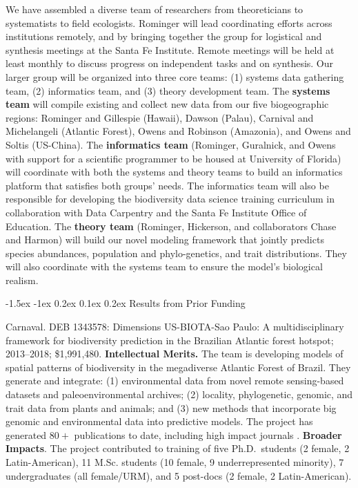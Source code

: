 \documentclass[11pt]{article}
\makeatletter
\renewcommand\section{\@startsection{section}{1}{\z@}%
                                  {-1.5ex \@plus -1ex \@minus 0.2ex}%
                                  {0.1ex \@plus 0.2ex}%
                                  {\normalfont\Large\bfseries}}
\renewcommand{\paragraph}{\@startsection{paragraph}{4}{\z@}
  {1.5ex \@plus 1ex \@minus .2ex}{-1em}
  {\normalfont\normalsize\it}
}
\makeatother
\begin{document}
We have assembled a diverse team of researchers from theoreticians to
systematists to field ecologists. Rominger will lead coordinating
efforts across institutions remotely, and by bringing together the group
for logistical and synthesis meetings at the Santa Fe Institute. Remote
meetings will be held at least monthly to discuss progress on
independent tasks and on synthesis. Our larger group will be organized
into three core teams: (1) systems data gathering team, (2) informatics
team, and (3) theory development team. The \textbf{systems team} will
compile existing and collect new data from our five biogeographic
regions: Rominger and Gillespie (Hawaii), Dawson (Palau), Carnival and
Michelangeli (Atlantic Forest), Owens and Robinson (Amazonia), and Owens
and Soltis (US-China). The \textbf{informatics team} (Rominger,
Guralnick, and Owens with support for a scientific programmer to be
housed at University of Florida) will coordinate with both the systems
and theory teams to build an informatics platform that satisfies both
groups' needs. The informatics team will also be responsible for
developing the biodiversity data science training curriculum in
collaboration with Data Carpentry and the Santa Fe Institute Office of
Education. The \textbf{theory team} (Rominger, Hickerson, and
collaborators Chase and Harmon) will build our novel modeling framework
that jointly predicts species abundances, population and phylo-genetics,
and trait distributions. They will also coordinate with the systems team
to ensure the model's biological realism.

\section{Results from Prior Funding} \label{results-from-prior-funding}

\paragraph{Carnaval.} DEB 1343578: Dimensions US-BIOTA-Sao Paulo: A
multidisciplinary framework for biodiversity prediction in the Brazilian
Atlantic forest hotspot; 2013--2018; \$1,991,480. \textbf{Intellectual
Merits.} The team is developing models of spatial patterns of
biodiversity in the megadiverse Atlantic Forest of Brazil. They generate
and integrate: (1) environmental data from novel remote sensing-based
datasets and paleoenvironmental archives; (2) locality, phylogenetic,
genomic, and trait data from plants and animals; and (3) new methods
that incorporate big genomic and environmental data into predictive
models. The project has generated $80+$ publications to date,
including high impact journals
\cite{Do_Amaral2016-bi,Prates2016-at,Prates2016-gr,Maestri2016-bp,Zamborlini_Saiter2016-zu,Montade2016-wl,Bernal2016-pd,Bustamante2016-qt,Gu2017-oz}.
\textbf{Broader Impacts}. The project contributed to training of five
Ph.D.~students (2 female, 2 Latin-American), 11 M.Sc. students (10
female, 9 underrepresented minority), 7 undergraduates (all female/URM),
and 5 post-docs (2 female, 2 Latin-American).
\end{document}
